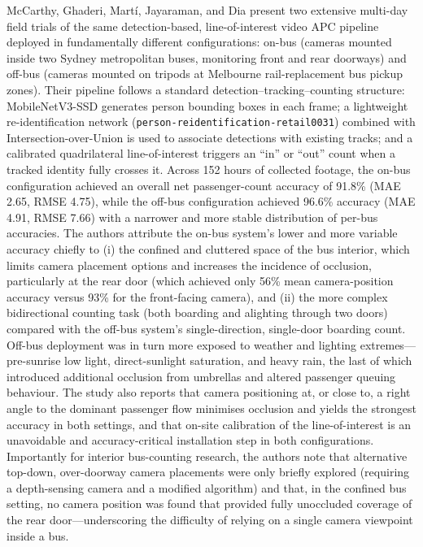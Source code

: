 \documentclass[12pt,a4paper]{report}
\begin{document}
McCarthy, Ghaderi, Martí, Jayaraman, and Dia present two extensive multi-day field trials of the same detection-based, line-of-interest video APC pipeline deployed in fundamentally different configurations: on-bus (cameras mounted inside two Sydney metropolitan buses, monitoring front and rear doorways) and off-bus (cameras mounted on tripods at Melbourne rail-replacement bus pickup zones). Their pipeline follows a standard detection--tracking--counting structure: MobileNetV3-SSD generates person bounding boxes in each frame; a lightweight re-identification network (\texttt{person-reidentification-retail0031}) combined with Intersection-over-Union is used to associate detections with existing tracks; and a calibrated quadrilateral line-of-interest triggers an ``in'' or ``out'' count when a tracked identity fully crosses it. Across 152 hours of collected footage, the on-bus configuration achieved an overall net passenger-count accuracy of 91.8\% (MAE 2.65, RMSE 4.75), while the off-bus configuration achieved 96.6\% accuracy (MAE 4.91, RMSE 7.66) with a narrower and more stable distribution of per-bus accuracies. The authors attribute the on-bus system's lower and more variable accuracy chiefly to (i) the confined and cluttered space of the bus interior, which limits camera placement options and increases the incidence of occlusion, particularly at the rear door (which achieved only 56\% mean camera-position accuracy versus 93\% for the front-facing camera), and (ii) the more complex bidirectional counting task (both boarding and alighting through two doors) compared with the off-bus system's single-direction, single-door boarding count. Off-bus deployment was in turn more exposed to weather and lighting extremes---pre-sunrise low light, direct-sunlight saturation, and heavy rain, the last of which introduced additional occlusion from umbrellas and altered passenger queuing behaviour. The study also reports that camera positioning at, or close to, a right angle to the dominant passenger flow minimises occlusion and yields the strongest accuracy in both settings, and that on-site calibration of the line-of-interest is an unavoidable and accuracy-critical installation step in both configurations. Importantly for interior bus-counting research, the authors note that alternative top-down, over-doorway camera placements were only briefly explored (requiring a depth-sensing camera and a modified algorithm) and that, in the confined bus setting, no camera position was found that provided fully unoccluded coverage of the rear door---underscoring the difficulty of relying on a single camera viewpoint inside a bus.
\end{document}
